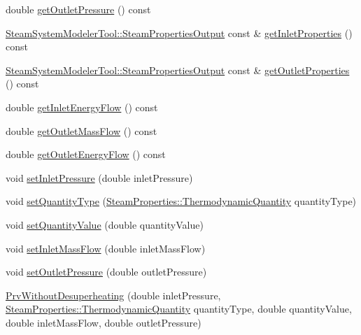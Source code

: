 \begin{DoxyCompactItemize}
\item 
double \hyperlink{class_prv_without_desuperheating_ae1d335703442deec2f2c2f93e4c862f2}{get\+Outlet\+Pressure} () const
\item 
\hyperlink{struct_steam_system_modeler_tool_1_1_steam_properties_output}{Steam\+System\+Modeler\+Tool\+::\+Steam\+Properties\+Output} const  \& \hyperlink{class_prv_without_desuperheating_aefb61f9d9dd99216459f6948308d11e9}{get\+Inlet\+Properties} () const
\item 
\hyperlink{struct_steam_system_modeler_tool_1_1_steam_properties_output}{Steam\+System\+Modeler\+Tool\+::\+Steam\+Properties\+Output} const  \& \hyperlink{class_prv_without_desuperheating_afcf1f5d7e6b18643ac8adc9023578147}{get\+Outlet\+Properties} () const
\item 
double \hyperlink{class_prv_without_desuperheating_a040dbe6a11a722f15450cd00ac454c48}{get\+Inlet\+Energy\+Flow} () const
\item 
double \hyperlink{class_prv_without_desuperheating_a12c0bf1f0c29e56e6e07ece3fe865c1b}{get\+Outlet\+Mass\+Flow} () const
\item 
double \hyperlink{class_prv_without_desuperheating_ab13245e86b90832de0b4190163236551}{get\+Outlet\+Energy\+Flow} () const
\item 
void \hyperlink{class_prv_without_desuperheating_a26039a0a228ca66f96e8402bf741b9d9}{set\+Inlet\+Pressure} (double inlet\+Pressure)
\item 
void \hyperlink{class_prv_without_desuperheating_a212177b7a16c7452358df4120196c04b}{set\+Quantity\+Type} (\hyperlink{class_steam_properties_ae0294bedf7d178c2d8fb6aed0f62fbff}{Steam\+Properties\+::\+Thermodynamic\+Quantity} quantity\+Type)
\item 
void \hyperlink{class_prv_without_desuperheating_a5ed2d0f0f558705d482ed0502131757f}{set\+Quantity\+Value} (double quantity\+Value)
\item 
void \hyperlink{class_prv_without_desuperheating_abeccff2dc91144452b34ca343ee63fa7}{set\+Inlet\+Mass\+Flow} (double inlet\+Mass\+Flow)
\item 
void \hyperlink{class_prv_without_desuperheating_a0f2a4597b58390e5c4a7c75b38bbebbc}{set\+Outlet\+Pressure} (double outlet\+Pressure)
\item 
\hyperlink{class_prv_without_desuperheating_a27a40131cc8567ec51bb8d6d522268c0}{Prv\+Without\+Desuperheating} (double inlet\+Pressure, \hyperlink{class_steam_properties_ae0294bedf7d178c2d8fb6aed0f62fbff}{Steam\+Properties\+::\+Thermodynamic\+Quantity} quantity\+Type, double quantity\+Value, double inlet\+Mass\+Flow, double outlet\+Pressure)

\end{DoxyCompactItemize}
